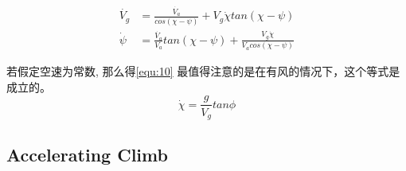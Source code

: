      \begin{equation}
        \begin{split}
          \dot{V_{g}} &= \frac{\dot{V_{a}}}{cos (\chi - \psi)} + V_{g} \dot{\chi} tan(\chi - \psi) \\
          \dot{\psi} &= \frac{\dot{V_{a}}}{V_{a}} tan (\chi - \psi) + \frac{V_{g} \dot{\chi}}{V_{a}cos(\chi - \psi)}
        \end{split}
    \end{equation}
    \par 若假定空速为常数, 那么得\ref{equ:10} 最值得注意的是在有风的情况下，这个等式是成立的。
    \begin{equation}
        \dot{\chi} = \frac{g}{V_{g}} tan \phi 
        \label{equ:10}
    \end{equation}
    \subsection{Accelerating Climb}
% 